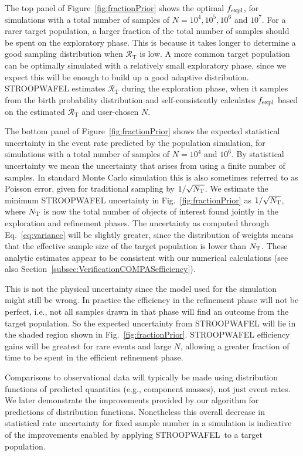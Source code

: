 \documentclass[a4paper,fleqn,usenatbib,useAMS,usedcolumn]{mnras}
\newcommand\rate{\mathcal{R}}
\newcommand{\AISs}{\textsc{STROOPWAFEL}}
\begin{document}
The top panel of Figure~\ref{fig:fractionPrior} shows the optimal $f_{\rm{expl}}$, for simulations with a total number of samples of $N = 10^4, 10^5, 10^6 $ and $10^7$.   For a rarer target population, a larger fraction of the total number of samples should be spent on the exploratory phase.  This is because it takes longer to determine a good sampling distribution when $\rate_{\text{T}}$ is low.
 A more common target population can be optimally simulated with a relatively small exploratory phase, since we expect this will be enough to build up a good adaptive distribution.    \AISs{} estimates $\rate_{\text{T}}$ during the exploration phase, when it samples from the birth probability distribution and self-consistently calculates $f_{\rm{expl}}$ based on the estimated $\rate_{\text{T}}$ and user-chosen $N$. 

The bottom panel of Figure~\ref{fig:fractionPrior} shows the expected statistical uncertainty in the event rate predicted by the population simulation, for simulations with a total number of samples of $N = 10^4 $ and $ 10^6 $. By statistical uncertainty we mean the uncertainty that arises from using a finite number of samples. In standard Monte Carlo simulation this is also sometimes referred to as Poisson error, given for traditional sampling by $1 / \sqrt{N_{\rm{T}}}$. We estimate the minimum \AISs{} uncertainty in Fig.~\ref{fig:fractionPrior} as $1/\sqrt{N_{\rm{T}}}$, where ${N_{\rm{T}}}$ is now the total number of objects of interest found jointly in the exploration and refinement phases. The uncertainty as computed through Eq.~\ref{eq:variance} will be slightly greater, since the distribution of weights means that the effective sample size of the target population is lower than ${N_{\rm{T}}}$. These analytic estimates appear to be consistent with our numerical calculations (see also Section~\ref{subsec:VerificationCOMPASefficiency}). 

This is not the physical uncertainty since the model used for the simulation might still be wrong. 
In practice the efficiency in the refinement phase will not be perfect, i.e., not all samples drawn in that phase will find an outcome from the target population.  So the expected uncertainty from \AISs{} will lie in  the shaded region shown in Fig.~\ref{fig:fractionPrior}.  \AISs{} efficiency gains will be greatest for rare events and large $N$, allowing a greater fraction of time to be spent in the efficient refinement phase.

Comparisons to observational data will typically be made using distribution functions of predicted quantities (e.g., component masses), not just event rates. We later demonstrate the improvements provided by our algorithm for predictions of distribution functions.  Nonetheless this overall decrease in statistical rate uncertainty for fixed sample number in a simulation is indicative of the improvements enabled by applying \AISs \  to a target population.  
\end{document}
